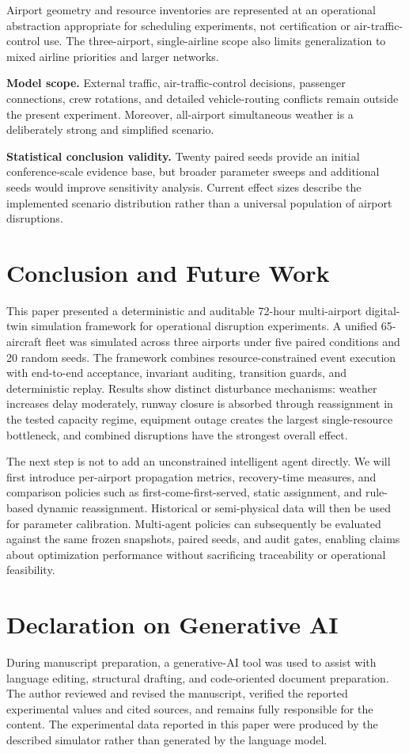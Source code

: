 \documentclass[runningheads]{llncs}
\begin{document}
Airport geometry and resource inventories are represented at an operational abstraction appropriate for scheduling experiments, not certification or air-traffic-control use. The three-airport, single-airline scope also limits generalization to mixed airline priorities and larger networks.

\textbf{Model scope.} External traffic, air-traffic-control decisions, passenger connections, crew rotations, and detailed vehicle-routing conflicts remain outside the present experiment. Moreover, all-airport simultaneous weather is a deliberately strong and simplified scenario.

\textbf{Statistical conclusion validity.} Twenty paired seeds provide an initial conference-scale evidence base, but broader parameter sweeps and additional seeds would improve sensitivity analysis. Current effect sizes describe the implemented scenario distribution rather than a universal population of airport disruptions.

\section{Conclusion and Future Work}
This paper presented a deterministic and auditable 72-hour multi-airport digital-twin simulation framework for operational disruption experiments. A unified 65-aircraft fleet was simulated across three airports under five paired conditions and 20 random seeds. The framework combines resource-constrained event execution with end-to-end acceptance, invariant auditing, transition guards, and deterministic replay. Results show distinct disturbance mechanisms: weather increases delay moderately, runway closure is absorbed through reassignment in the tested capacity regime, equipment outage creates the largest single-resource bottleneck, and combined disruptions have the strongest overall effect.

The next step is not to add an unconstrained intelligent agent directly. We will first introduce per-airport propagation metrics, recovery-time measures, and comparison policies such as first-come-first-served, static assignment, and rule-based dynamic reassignment. Historical or semi-physical data will then be used for parameter calibration. Multi-agent policies can subsequently be evaluated against the same frozen snapshots, paired seeds, and audit gates, enabling claims about optimization performance without sacrificing traceability or operational feasibility.

\section*{Declaration on Generative AI}
During manuscript preparation, a generative-AI tool was used to assist with language editing, structural drafting, and code-oriented document preparation. The author reviewed and revised the manuscript, verified the reported experimental values and cited sources, and remains fully responsible for the content. The experimental data reported in this paper were produced by the described simulator rather than generated by the language model.
\end{document}
